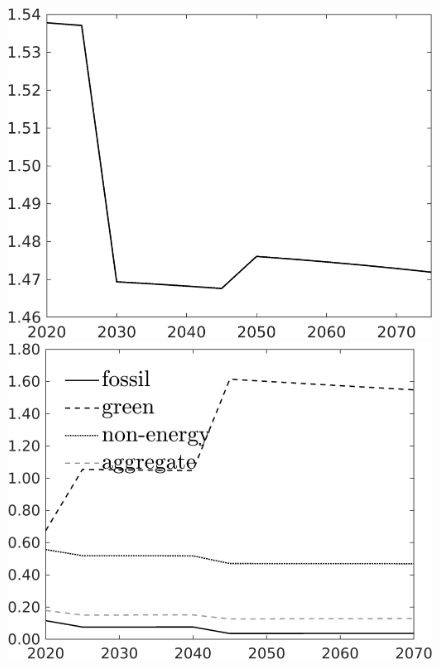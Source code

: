 \begin{figure}[h!!]
\begin{minipage}[]{0.32\textwidth}
	\end{minipage}
	\begin{minipage}[]{0.32\textwidth}
		\includegraphics[width=1\textwidth]{../../codding_model/own_basedOnFried/optimalPol_190722_tidiedUp/figures/all_July22/hhhl_SingleAltPolOPT_T_NoTaus_regime3_spillover0_noskill0_sep1_xgrowth0_etaa0.79.png}
	\end{minipage}
	\begin{minipage}[]{0.32\textwidth}
		\includegraphics[width=1\textwidth]{../../codding_model/own_basedOnFried/optimalPol_190722_tidiedUp/figures/all_July22/SingleJointTOT_regime3_OPT_T_NoTaus_Growth_spillover0_noskill0_sep1_xgrowth0_extern0_etaa0.79_lgd1.png}

\end{minipage}
\end{figure}
